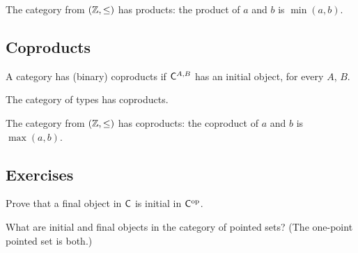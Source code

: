 \begin{proposition}
  \label{prop:prelims:has-products-le-int}
  The category from $(\mathbb{Z},\leq)$ has products: the product of $a$ and
  $b$ is $\min(a,b)$.
\end{proposition}

\subsection{Coproducts}
\label{subsec:prelims:coproducts}

\begin{definition}
  \label{def:prelims:has-coproducts}
  \leanok
  A category has (binary) coproducts if $\mathsf{C}^{A,B}$ has an
  initial object, for every $A$, $B$.
\end{definition}

\begin{proposition}
  \label{prop:prelims:disjoint-union-coproduct}
  The category of types has coproducts.
\end{proposition}

\begin{proposition}
  \label{prop:prelims:has-coproducts-le-int}
  The category from $(\mathbb{Z},\leq)$ has coproducts: the coproduct of $a$
  and $b$ is $\max(a,b)$.
\end{proposition}

\subsection*{Exercises}

\begin{exercise}
  \label{exer:prelims:init-of-final-op}
  Prove that a final object in $\mathsf{C}$ is initial in
  $\mathsf{C}^{\mathrm{op}}$.
\end{exercise}

\begin{exercise}
  \label{exer:prelims:init-final-pntd}
  What are initial and final objects in the category of pointed
  sets? (The one-point pointed set is both.)
\end{exercise}

